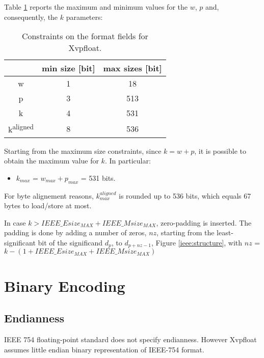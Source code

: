 Table \ref{tab:ieee-sizes} reports the maximum and minimum values for the $w$,
$p$ and, consequently, the $k$ parameters:
\begin{table}[htbp]
\centering
\begin{tabular}{c|c|c}
                           & min size {[}bit{]} & \multicolumn{1}{l}{max sizes {[}bit{]}} \\ \hline
w                          & 1                  & \multicolumn{1}{c|}{18}                 \\ \hline
p                          & 3                  & \multicolumn{1}{c|}{513}                \\ \hline
k                          & 4                  & \multicolumn{1}{c|}{531}                \\ \hline
k\textsuperscript{aligned} & 8                  & \multicolumn{1}{c|}{536}                \\ \cline{2-3}
\end{tabular}
\caption{Constraints on the format fields for Xvpfloat.}
\label{tab:ieee-sizes}
\end{table}

Starting from the maximum size constraints, since $k=w+p$, it is possible to
obtain the
maximum value for $k$. In particular:
\begin{itemize}[topsep=0pt]
    \item $k_{max}$ = $w_{max} + p_{max}$ = 531 bits.
\end{itemize}
For byte alignement reasons, $k^{aligned}_{max}$ is rounded up to 536 bits, which equals 67 bytes to load/store at most.

In case $k > IEEE\_Esize_{MAX}+IEEE\_Msize_{MAX}$, zero-padding is inserted.
The padding is done by adding a number of zeros, $nz$, starting from the least-significant
bit of the significand $d_{p}$, to $d_{p+nz-1}$, Figure \ref{ieee:structure}, with $nz$ = $k -
(1+IEEE\_Esize_{MAX}+IEEE\_Msize_{MAX})$
\section{Binary Encoding}

\subsection{Endianness}

IEEE 754 floating-point standard does not specify endianness.
However Xvpfloat assumes little endian binary representation of IEEE-754 format.

